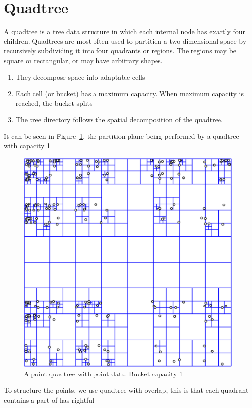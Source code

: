 \documentclass[ijoc,nonblindrev]{informs3} %
\begin{document}
\section{Quadtree}
A quadtree is a tree data structure in which each internal node has exactly four children. 
Quadtrees are most often used to partition a two-dimensional space by recursively 
subdividing it into four quadrants or regions. 
The regions may be square or rectangular, or may have arbitrary shapes. 
\begin{enumerate}
\item They decompose space into adaptable cells
\item Each cell (or bucket) has a maximum capacity. When maximum capacity is reached, the bucket splits
\item The tree directory follows the spatial decomposition of the quadtree.
\end{enumerate}
It can be seen in Figure~\ref{fig:quadtree},
the partition plane being performed by a quadtree with capacity 1

\begin{figure}[h!]
  \centering
  \includegraphics[scale=0.5]{images/point-quadtree}
  \caption{A point quadtree with point data. Bucket capacity 1}
  \label{fig:quadtree}
\end{figure}
To structure the points, we use quadtree with overlap,
this is that each quadrant contains a part of has rightful
\end{document}

